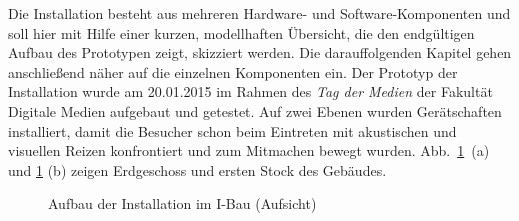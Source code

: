 
Die Installation besteht aus mehreren Hardware- und Software-Komponenten und soll hier mit Hilfe einer kurzen, modellhaften Übersicht, die den endgültigen Aufbau des Prototypen zeigt, skizziert werden. Die darauffolgenden Kapitel gehen anschließend näher auf die einzelnen Komponenten ein. Der Prototyp der Installation wurde am 20.01.2015 im Rahmen des \textit{Tag der Medien} der Fakultät Digitale Medien aufgebaut und getestet. Auf zwei Ebenen wurden Gerätschaften installiert, damit die Besucher schon beim Eintreten mit akustischen und visuellen Reizen konfrontiert und zum Mitmachen bewegt wurden. Abb.~\ref{fig:Aufbau}~(a) und \ref{fig:Aufbau} (b) zeigen Erdgeschoss und ersten Stock des Gebäudes.

\begin{figure}[htbp]
\hfill
{}
\caption{Aufbau der Installation im I-Bau (Aufsicht)}
\label{fig:Aufbau}
\end{figure}

